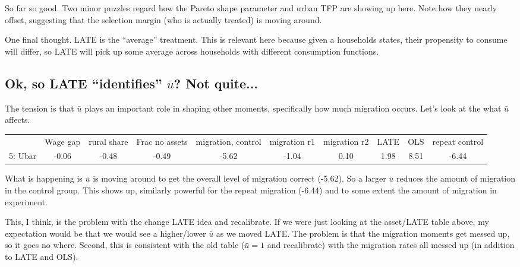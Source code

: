 \documentclass[pdftex,11pt]{article}
\renewcommand{\arraystretch}{.7}
\begin{document}
So far so good. Two minor puzzles regard how the Pareto shape parameter and urban TFP are showing up here. Note how they nearly offset, suggesting that the selection margin (who is actually treated) is moving around.

One final thought. LATE is the ``average'' treatment. This is relevant here because given a households states, their propensity to consume will differ, so LATE will pick up some average across households with different consumption functions.

\subsection{Ok, so LATE ``identifies'' $\bar u$? Not quite...}

The tension is that $\bar u$ plays an important role in shaping other moments, specifically how much migration occurs. Let's look at the what $\bar u$ affects.

\begin{table}[!h]
\footnotesize
\setlength {\tabcolsep}{1.5mm}
\renewcommand{\arraystretch}{2.25}
\begin{center}\label{tb:employment}
\begin{tabular}{l c c c c c c c c c }
\hline
\hline
& Wage gap & rural share &  Frac no assets & migration, control &  migration r1 & migration r2 & LATE & OLS & repeat control \\
5: Ubar &  -0.06 &   -0.48 &  -0.49  & -5.62  & -1.04  &  0.10  &  1.98  &  8.51  & -6.44 \\

\hline
\hline
\end{tabular}
\end{center}
\end{table}

What is happening is $\bar u$ is moving around to get the overall level of migration correct (-5.62). So a larger $\bar u$ reduces the amount of migration in the control group. This shows up, similarly powerful for the repeat migration (-6.44) and to some extent the amount of migration in experiment.

This, I think, is the problem with the change LATE idea and recalibrate. If we were just looking at the asset/LATE table above, my expectation would be that we would see a higher/lower $\bar u$ as we moved LATE. The problem is that the migration moments get messed up, so it goes no where. Second, this is consistent with the old table ($\bar u = 1$ and recalibrate) with the migration rates all messed up (in addition to LATE and OLS).
\end{document}

